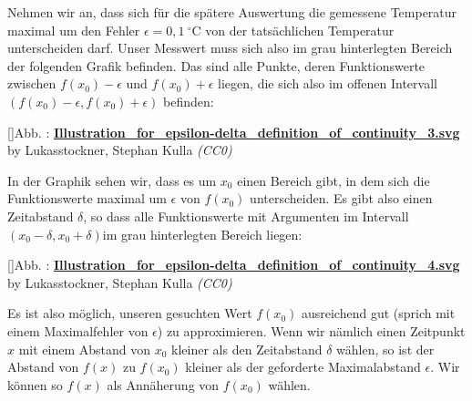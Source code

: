 \documentclass[fontsize=9pt,
               parskip=half-,
               DIV=14,
               listof=chapterentry,
               tocflat]{scrbook}
\newcounter{imagelabel}
\begin{document}
Nehmen wir an, dass sich für die spätere Auswertung die gemessene Temperatur maximal um den Fehler $\epsilon =0{,}1\ \mathrm {^{\circ }C} $ von der tatsächlichen Temperatur unterscheiden darf. Unser Messwert muss sich also im grau hinterlegten Bereich der folgenden Grafik befinden. Das sind alle Punkte, deren Funktionswerte zwischen $f(x_{0})-\epsilon $ und $f(x_{0})+\epsilon $ liegen, die sich also im offenen Intervall $(f(x_{0})-\epsilon ,f(x_{0})+\epsilon )$ befinden:

[]{Abb. : \protect\href{https://commons.wikimedia.org/wiki/File:Illustration_for_epsilon-delta_definition_of_continuity_3.svg}{\textbf{Illustration\allowbreak\_for\allowbreak\_epsilon\allowbreak-delta\allowbreak\_definition\allowbreak\_of\allowbreak\_continuity\allowbreak\_3.svg}} by Lukasstockner, Stephan Kulla \textit{(CC0)}}\begin{center}
\end{center}

In der Graphik sehen wir, dass es um $x_{0}$ einen Bereich gibt, in dem sich die Funktionswerte maximal um $\epsilon $ von $f(x_{0})$ unterscheiden. Es gibt also einen Zeitabstand $\delta $, so dass alle Funktionswerte mit Argumenten im Intervall $(x_{0}-\delta ,x_{0}+\delta )$im grau hinterlegten Bereich liegen:

[]{Abb. : \protect\href{https://commons.wikimedia.org/wiki/File:Illustration_for_epsilon-delta_definition_of_continuity_4.svg}{\textbf{Illustration\allowbreak\_for\allowbreak\_epsilon\allowbreak-delta\allowbreak\_definition\allowbreak\_of\allowbreak\_continuity\allowbreak\_4.svg}} by Lukasstockner, Stephan Kulla \textit{(CC0)}}\begin{center}
\end{center}

Es ist also möglich, unseren gesuchten Wert $f(x_{0})$ ausreichend gut (sprich mit einem Maximalfehler von $\epsilon $) zu approximieren. Wenn wir nämlich einen Zeitpunkt $x$ mit einem Abstand von $x_{0}$ kleiner als den Zeitabstand $\delta $ wählen, so ist der Abstand von $f(x)$ zu $f(x_{0})$ kleiner als der geforderte Maximalabstand $\epsilon $. Wir können so $f(x)$ als Annäherung von $f(x_{0})$ wählen.
\end{document}
